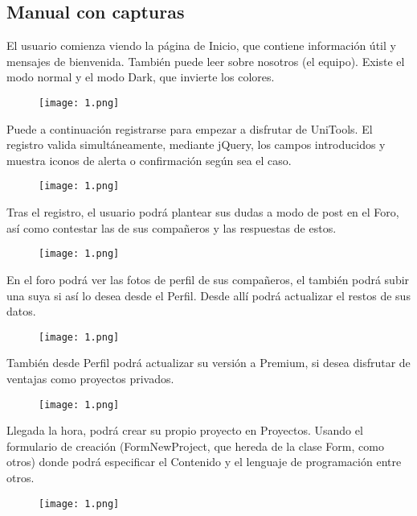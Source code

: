 \documentclass[12pt]{report}
\begin{document}
\subsection{Manual con capturas}
El usuario comienza viendo la página de Inicio, que contiene información útil y mensajes de bienvenida. También puede leer sobre nosotros (el equipo). Existe el modo normal y el modo Dark, que invierte los colores. 

\begin{figure}[h]
 \centering
  \texttt{[image: 1.png]}
\end{figure}

Puede a continuación registrarse para empezar a disfrutar de UniTools. El registro valida simultáneamente, mediante jQuery, los campos introducidos y muestra iconos de alerta o confirmación según sea el caso.

\begin{figure}[!h]
 \centering
  \texttt{[image: 1.png]}
\end{figure}

Tras el registro, el usuario podrá plantear sus dudas a modo de post en el Foro, así como contestar las de sus compañeros y las respuestas de estos. 

\begin{figure}[!h]
 \centering
  \texttt{[image: 1.png]}
\end{figure}

En el foro podrá ver las fotos de perfil de sus compañeros, el también podrá subir una suya si así lo desea desde el Perfil. Desde allí podrá actualizar el restos de sus datos.

\begin{figure}[!h]
 \centering
  \texttt{[image: 1.png]}
\end{figure}

También desde Perfil podrá actualizar su versión a Premium, si desea disfrutar de ventajas como proyectos privados.

\begin{figure}[!h]
 \centering
  \texttt{[image: 1.png]}
\end{figure}

Llegada la hora, podrá crear su propio proyecto en Proyectos. Usando el formulario de creación (FormNewProject, que hereda de la clase Form, como otros) donde podrá especificar el Contenido y el lenguaje de programación entre otros.

\begin{figure}[!h]
 \centering
  \texttt{[image: 1.png]}
\end{figure}
\end{document}
